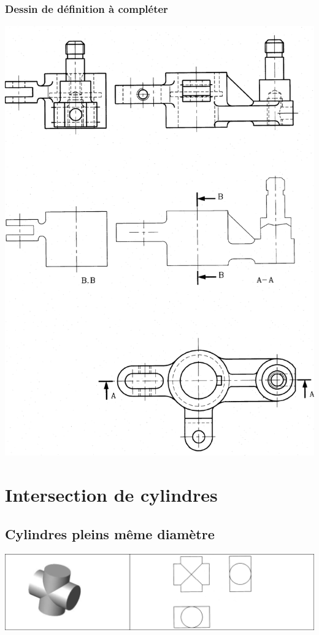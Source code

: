 \documentclass[11pt,oneside]{article}
\begin{document}
\subsubsection*{Dessin de définition à compléter}

\begin{center}
\includegraphics[width=.9\textwidth]{png/fig14}
\end{center}
%
%

\section{Intersection de cylindres}
\subsection{Cylindres pleins même diamètre}
\begin{center}
\includegraphics[width=.9\textwidth]{png/fig17}
\end{center}
\end{document}
